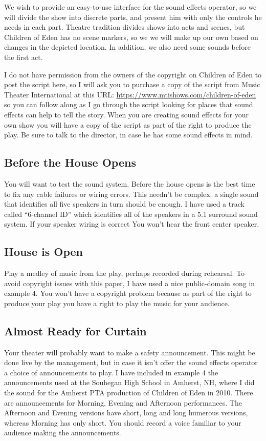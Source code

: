 \documentclass[letterpaper,twoside]{article}
\begin{document}
We wish to provide an easy-to-use interface for the sound effects
operator, so we will divide the show into discrete parts, and present
him with only the controls he needs in each part.  Theatre tradition
divides shows into acts and scenes, but Children of Eden has no scene
markers, so we we will make up our own based on changes in
the depicted location.
In addition, we also need some sounds before the first act.

I do not have permission from the owners of the copyright on
Children of Eden to post the script here, so I will ask you
to purchase a copy of the script from Music Theater International
at this URL: \url{https://www.mtishows.com/children-of-eden}
so you can follow along as I go through the script looking for
places that sound effects can help to tell the story.  When you are
creating sound effects for your own show you will have a copy of
the script as part of the right to produce the play.  Be sure to
talk to the director, in case he has some sound effects in mind.

\subsection{Before the House Opens}
You will want to test the sound system.  Before the house opens is the best
time to fix any cable failures or wiring errors.  This needn't be complex:
a single sound that identifies all five speakers in turn should be enough.
I have used a track called ``6-channel ID'' which identifies all of the
speakers in a 5.1 surround sound system.  If your speaker wiring is correct
You won't hear the front center speaker.

\subsection{House is Open}
Play a medley of music from the play, perhaps recorded during rehearsal.
To avoid copyright issues with this paper, I have used a nice public-domain song
in example 4.  You won't have a copyright problem because as part of the right
to produce your play you have a right to play the music for your audience.

\subsection{Almost Ready for Curtain}
Your theater will probably want to make a safety announcement.
This might be done live by the management, but in case it isn't
offer the sound effects operator a choice of announcements
to play.  I have included in example 4 the announcements used at
the Souhegan High School in Amherst, NH, where I did the sound
for the Amherst PTA production of Children of Eden in 2010.
There are announcements for Morning, Evening and Afternoon
performances.  The Afternoon and Evening versions have
short, long and long humerous versions, whereas Morning
has only short.  You should record a voice familiar to your audience
making the announcements.
\end{document}
